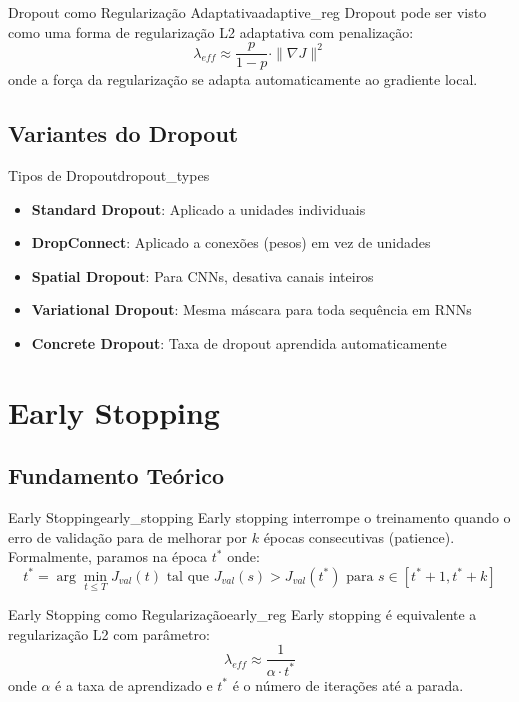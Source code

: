 \documentclass[a4paper,12pt]{article}
\begin{document}
\begin{definicao}{Dropout como Regularização Adaptativa}{adaptive_reg}
Dropout pode ser visto como uma forma de regularização L2 adaptativa com penalização:
\[
\lambda_{eff} \approx \frac{p}{1-p} \cdot \|\nabla J\|^2
\]
onde a força da regularização se adapta automaticamente ao gradiente local.
\end{definicao}

\subsection{Variantes do Dropout}

\begin{observacao}{Tipos de Dropout}{dropout_types}
\begin{itemize}
    \item \textbf{Standard Dropout}: Aplicado a unidades individuais
    \item \textbf{DropConnect}: Aplicado a conexões (pesos) em vez de unidades
    \item \textbf{Spatial Dropout}: Para CNNs, desativa canais inteiros
    \item \textbf{Variational Dropout}: Mesma máscara para toda sequência em RNNs
    \item \textbf{Concrete Dropout}: Taxa de dropout aprendida automaticamente
\end{itemize}
\end{observacao}

\section{Early Stopping}

\subsection{Fundamento Teórico}

\begin{definicao}{Early Stopping}{early_stopping}
Early stopping interrompe o treinamento quando o erro de validação para de melhorar por $k$ épocas consecutivas (patience). Formalmente, paramos na época $t^*$ onde:
\[
t^* = \arg\min_{t \leq T} J_{val}(t) \text{ tal que } J_{val}(s) > J_{val}(t^*) \text{ para } s \in [t^*+1, t^*+k]
\]
\end{definicao}

\begin{teorema}{Early Stopping como Regularização}{early_reg}
Early stopping é equivalente a regularização L2 com parâmetro:
\[
\lambda_{eff} \approx \frac{1}{\alpha \cdot t^*}
\]
onde $\alpha$ é a taxa de aprendizado e $t^*$ é o número de iterações até a parada.
\end{teorema}
\end{document}
